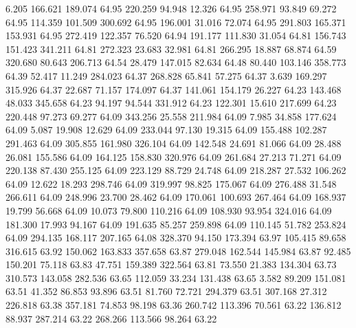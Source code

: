    6.205  166.621  189.074        64.95
 220.259   94.948   12.326        64.95
 258.971   93.849   69.272        64.95
 114.359  101.509  300.692        64.95
 196.001   31.016   72.074        64.95
 291.803  165.371  153.931        64.95
 272.419  122.357   76.520        64.94
 191.177  111.830   31.054        64.81
 156.743  151.423  341.211        64.81
 272.323   23.683   32.981        64.81
 266.295   18.887   68.874        64.59
 320.680   80.643  206.713        64.54
  28.479  147.015   82.634        64.48
  80.440  103.146  358.773        64.39
  52.417   11.249  284.023        64.37
 268.828   65.841   57.275        64.37
   3.639  169.297  315.926        64.37
  22.687   71.157  174.097        64.37
 141.061  154.179   26.227        64.23
 143.468   48.033  345.658        64.23
  94.197   94.544  331.912        64.23
 122.301   15.610  217.699        64.23
 220.448   97.273   69.277        64.09
 343.256   25.558  211.984        64.09
   7.985   34.858  177.624        64.09
   5.087   19.908   12.629        64.09
 233.044   97.130   19.315        64.09
 155.488  102.287  291.463        64.09
 305.855  161.980  326.104        64.09
 142.548   24.691   81.066        64.09
  28.488   26.081  155.586        64.09
 164.125  158.830  320.976        64.09
 261.684   27.213   71.271        64.09
 220.138   87.430  255.125        64.09
 223.129   88.729   24.748        64.09
 218.287   27.532  106.262        64.09
  12.622   18.293  298.746        64.09
 319.997   98.825  175.067        64.09
 276.488   31.548  266.611        64.09
 248.996   23.700   28.462        64.09
 170.061  100.693  267.464        64.09
 168.937   19.799   56.668        64.09
  10.073   79.800  110.216        64.09
 108.930   93.954  324.016        64.09
 181.300   17.993   94.167        64.09
 191.635   85.257  259.898        64.09
 110.145   51.782  253.824        64.09
 294.135  168.117  207.165        64.08
 328.370   94.150  173.394        63.97
 105.415   89.658  316.615        63.92
 150.062  163.833  357.658        63.87
 279.048  162.544  145.984        63.87
  92.485  150.201   75.118        63.83
  47.751  159.389  322.564        63.81
  73.550   21.383  134.304        63.73
 310.573  143.058  282.536        63.65
 112.059   33.234  131.438        63.65
   3.582   89.209  151.081        63.51
  41.352   86.853   93.896        63.51
  81.760   72.721  294.379        63.51
 307.168   27.312  226.818        63.38
 357.181   74.853   98.198        63.36
 260.742  113.396   70.561        63.22
 136.812   88.937  287.214        63.22
 268.266  113.566   98.264        63.22
